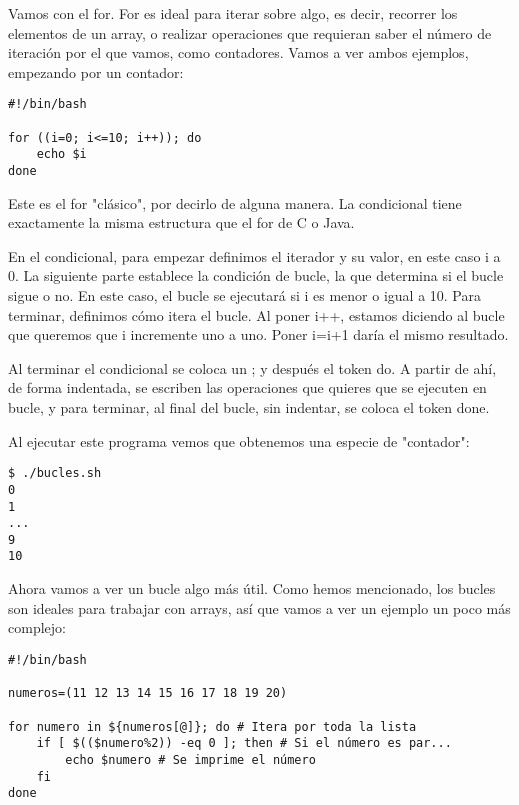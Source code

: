 Vamos con el for. For es ideal para iterar sobre algo, es decir, recorrer los elementos de un array, o realizar operaciones que requieran saber el número de iteración por el que vamos, como contadores. Vamos a ver ambos ejemplos, empezando por un contador:

\begin{tcolorbox-code}
\begin{lstlisting}
#!/bin/bash

for ((i=0; i<=10; i++)); do
	echo $i
done
\end{lstlisting}
\end{tcolorbox-code}

Este es el for "clásico", por decirlo de alguna manera. La condicional tiene exactamente la misma estructura que el for de C o Java. 

En el condicional, para empezar definimos el iterador y su valor, en este caso i a 0. La siguiente parte establece la condición de bucle, la que determina si el bucle sigue o no. En este caso, el bucle se ejecutará si i es menor o igual a 10. Para terminar, definimos cómo itera el bucle. Al poner i++, estamos diciendo al bucle que queremos que i incremente uno a uno. Poner i=i+1 daría el mismo resultado.

Al terminar el condicional se coloca un ; y después el token do.
A partir de ahí, de forma indentada, se escriben las operaciones que quieres que se ejecuten en bucle, y para terminar, al final del bucle, sin indentar, se coloca el token done.

Al ejecutar este programa vemos que obtenemos una especie de "contador":

\begin{tcolorbox-code}
\begin{lstlisting}
$ ./bucles.sh
0
1
...
9
10
\end{lstlisting}
\end{tcolorbox-code}

Ahora vamos a ver un bucle algo más útil. Como hemos mencionado, los bucles son ideales para trabajar con arrays, así que vamos a ver un ejemplo un poco más complejo:

\begin{tcolorbox-code}
\begin{lstlisting}
#!/bin/bash

numeros=(11 12 13 14 15 16 17 18 19 20)

for numero in ${numeros[@]}; do # Itera por toda la lista
    if [ $(($numero%2)) -eq 0 ]; then # Si el número es par...
		echo $numero # Se imprime el número
    fi
done 
\end{lstlisting}
\end{tcolorbox-code}

